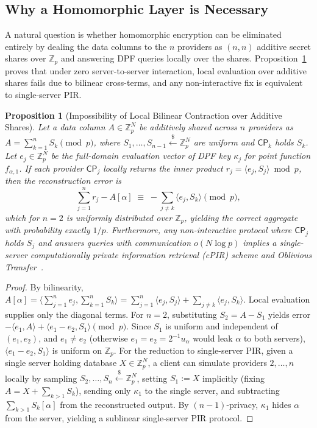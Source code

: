 \documentclass[11pt,a4paper]{article}
\newtheorem{proposition}{Proposition}
\begin{document}
\subsection{Why a Homomorphic Layer is Necessary}\label{sec:why_he}
A natural question is whether homomorphic encryption can be eliminated entirely by dealing the data columns to the $n$ providers as $(n,n)$ additive secret shares over $\mathbb{Z}_p$ and answering DPF queries locally over the shares. Proposition~\ref{prop:no_local} proves that under zero server-to-server interaction, local evaluation over additive shares fails due to bilinear cross-terms, and any non-interactive fix is equivalent to single-server PIR.

\begin{proposition}[Impossibility of Local Bilinear Contraction over Additive Shares]\label{prop:no_local}
Let a data column $A \in \mathbb{Z}_p^N$ be additively shared across $n$ providers as $A = \sum_{k=1}^n S_k \pmod p$, where $S_1, \dots, S_{n-1} \xleftarrow{\$} \mathbb{Z}_p^N$ are uniform and $\mathsf{CP}_k$ holds $S_k$. Let $e_j \in \mathbb{Z}_p^N$ be the full-domain evaluation vector of DPF key $\kappa_j$ for point function $f_{\alpha,1}$. If each provider $\mathsf{CP}_j$ locally returns the inner product $r_j = \langle e_j, S_j \rangle \bmod p$, then the reconstruction error is
\begin{equation}
    \sum_{j=1}^n r_j - A[\alpha] \;\equiv\; -\sum_{j \neq k} \langle e_j, S_k \rangle \pmod p,
\end{equation}
which for $n = 2$ is uniformly distributed over $\mathbb{Z}_p$, yielding the correct aggregate with probability exactly $1/p$. Furthermore, any non-interactive protocol where $\mathsf{CP}_j$ holds $S_j$ and answers queries with communication $o(N \log p)$ implies a single-server computationally private information retrieval (cPIR) scheme and Oblivious Transfer~\cite{dicrescenzo2000,kushilevitz1997}.
\end{proposition}

\begin{proof}
By bilinearity, $A[\alpha] = \langle \sum_{j=1}^n e_j, \sum_{k=1}^n S_k \rangle = \sum_{j=1}^n \langle e_j, S_j \rangle + \sum_{j \neq k} \langle e_j, S_k \rangle$. Local evaluation supplies only the diagonal terms. For $n=2$, substituting $S_2 = A - S_1$ yields error $-\langle e_1, A\rangle + \langle e_1 - e_2, S_1\rangle \pmod p$. Since $S_1$ is uniform and independent of $(e_1, e_2)$, and $e_1 \neq e_2$ (otherwise $e_1 = e_2 = 2^{-1}u_\alpha$ would leak $\alpha$ to both servers), $\langle e_1 - e_2, S_1\rangle$ is uniform on $\mathbb{Z}_p$. For the reduction to single-server PIR, given a single server holding database $X \in \mathbb{Z}_p^N$, a client can simulate providers $2, \dots, n$ locally by sampling $S_2, \dots, S_n \xleftarrow{\$} \mathbb{Z}_p^N$, setting $S_1 := X$ implicitly (fixing $A = X + \sum_{k>1} S_k$), sending only $\kappa_1$ to the single server, and subtracting $\sum_{k>1} S_k[\alpha]$ from the reconstructed output. By $(n-1)$-privacy, $\kappa_1$ hides $\alpha$ from the server, yielding a sublinear single-server PIR protocol.
\end{proof}
\end{document}
